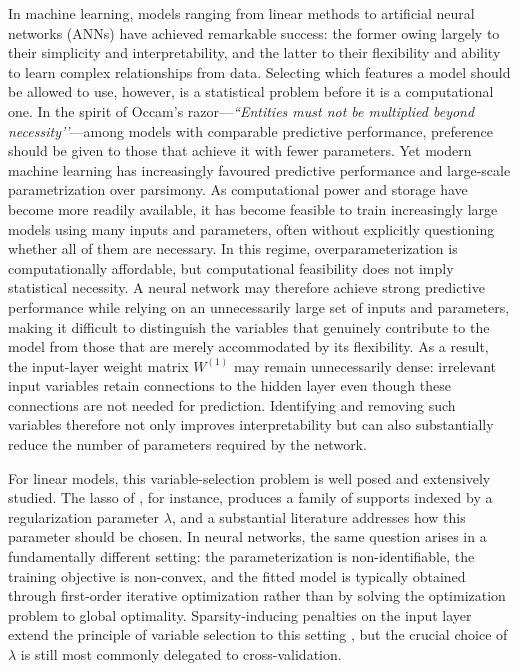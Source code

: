 \documentclass[twoside,11pt]{article}
\newcommand{\Wone}{W^{(1)}}
\begin{document}
In machine learning, models ranging from linear methods to artificial neural networks (ANNs) have achieved remarkable success: the former owing largely to their simplicity and interpretability, and the latter to their flexibility and ability to learn complex relationships from data. Selecting which features a model should be allowed to use, however, is a statistical problem before it is a computational one. In the spirit of Occam’s razor—\textit{``Entities must not be multiplied beyond necessity’’}—among models with comparable predictive performance, preference should be given to those that achieve it with fewer parameters. Yet modern machine learning has increasingly favoured predictive performance and large-scale parametrization over parsimony. As computational power and storage have become more readily available, it has become feasible to train increasingly large models using many inputs and parameters, often without explicitly questioning whether all of them are necessary. In this regime, overparameterization is computationally affordable, but computational feasibility does not imply statistical necessity.  A neural network may therefore achieve strong predictive performance while relying on an unnecessarily large set of inputs and parameters, making it difficult to distinguish the variables that genuinely contribute to the model from those that are merely accommodated by its flexibility. As a result, the input-layer weight matrix $\Wone$ may remain unnecessarily dense: irrelevant input variables retain connections to the hidden layer even though these connections are not needed for prediction. Identifying and removing such variables therefore not only improves interpretability but can also substantially reduce the number of parameters required by the network. 

For linear models, this variable-selection problem is well posed and extensively studied. The lasso of \citet{tibshirani1996}, for instance, produces a family of supports indexed by a regularization parameter $\lambda$, and a substantial literature addresses how this parameter should be chosen. In neural networks, the same question arises in a fundamentally different setting: the parameterization is non-identifiable, the training objective is non-convex, and the fitted model is typically obtained through first-order iterative optimization rather than by solving the optimization problem to global optimality. Sparsity-inducing penalties on the input layer extend the principle of variable selection to this setting \citep{FengSimon2019,LassoNet}, but the crucial choice of $\lambda$ is still most commonly delegated to cross-validation.
\end{document}
